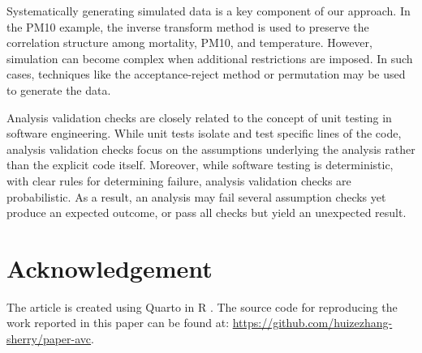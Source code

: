 \documentclass[
  12pt,
]{interact}
\begin{document}
Systematically generating simulated data is a key component of our
approach. In the PM10 example, the inverse transform method is used to
preserve the correlation structure among mortality, PM10, and
temperature. However, simulation can become complex when additional
restrictions are imposed. In such cases, techniques like the
acceptance-reject method or permutation may be used to generate the
data.

Analysis validation checks are closely related to the concept of unit
testing in software engineering. While unit tests isolate and test
specific lines of the code, analysis validation checks focus on the
assumptions underlying the analysis rather than the explicit code
itself. Moreover, while software testing is deterministic, with clear
rules for determining failure, analysis validation checks are
probabilistic. As a result, an analysis may fail several assumption
checks yet produce an expected outcome, or pass all checks but yield an
unexpected result.

\section{Acknowledgement}\label{acknowledgement}

The article is created using Quarto \citep{Allaire_Quarto_2022} in R
\citep{R}. The source code for reproducing the work reported in this
paper can be found at:
\url{https://github.com/huizezhang-sherry/paper-avc}.


\renewcommand\refname{References}
  
\end{document}
